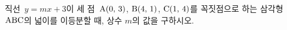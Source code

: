 직선~$y=mx+3$이 세 점~$\mathrm{A}(0,\,3)$, $\mathrm{B}(4,\,1)$, $\mathrm{C}(1,\,4)$를 꼭짓점으로 하는 삼각형~$\mathrm{ABC}$의 넓이를 이등분할 때, 상수 $m$의 값을 구하시오.

